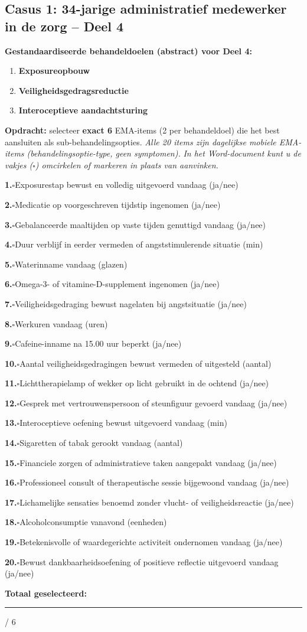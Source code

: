 \documentclass[11pt,a4paper]{article}
\newcommand{\checkitemBFS}[2]{%
\noindent\small\textbf{#1.}\hspace{0.45em}$\square$\hspace{0.4em}#2\par\vspace{0.20em}}
\begin{document}
\newpage
\subsection*{Casus 1: 34-jarige administratief medewerker in de zorg -- Deel 4}

\begin{contextbox}
\small\textbf{Gestandaardiseerde behandeldoelen (abstract) voor Deel 4:}
\begin{enumerate}[topsep=2pt,itemsep=1pt,label=\arabic*.]
\item \textbf{Exposureopbouw}
\item \textbf{Veiligheidsgedragsreductie}
\item \textbf{Interoceptieve aandachtsturing}
\end{enumerate}
\end{contextbox}

\begin{responsebox}[title={Uw antwoord -- Deel 4}]
\small\textbf{Opdracht:} selecteer \textbf{exact 6} EMA-items (2 per behandeldoel) die het best aansluiten als sub-behandelingsopties.
\textit{Alle 20 items zijn dagelijkse mobiele EMA-items (behandelingsoptie-type, geen symptomen).}
\textit{In het Word-document kunt u de vakjes ($\square$) omcirkelen of markeren in plaats van aanvinken.}

\checkitemBFS{1}{Exposurestap bewust en volledig uitgevoerd vandaag (ja/nee)}
\checkitemBFS{2}{Medicatie op voorgeschreven tijdstip ingenomen (ja/nee)}
\checkitemBFS{3}{Gebalanceerde maaltijden op vaste tijden genuttigd vandaag (ja/nee)}
\checkitemBFS{4}{Duur verblijf in eerder vermeden of angststimulerende situatie (min)}
\checkitemBFS{5}{Waterinname vandaag (glazen)}
\checkitemBFS{6}{Omega-3- of vitamine-D-supplement ingenomen (ja/nee)}
\checkitemBFS{7}{Veiligheidsgedraging bewust nagelaten bij angstsituatie (ja/nee)}
\checkitemBFS{8}{Werkuren vandaag (uren)}
\checkitemBFS{9}{Cafeine-inname na 15.00 uur beperkt (ja/nee)}
\checkitemBFS{10}{Aantal veiligheidsgedragingen bewust vermeden of uitgesteld (aantal)}
\checkitemBFS{11}{Lichttherapielamp of wekker op licht gebruikt in de ochtend (ja/nee)}
\checkitemBFS{12}{Gesprek met vertrouwenspersoon of steunfiguur gevoerd vandaag (ja/nee)}
\checkitemBFS{13}{Interoceptieve oefening bewust uitgevoerd vandaag (min)}
\checkitemBFS{14}{Sigaretten of tabak gerookt vandaag (aantal)}
\checkitemBFS{15}{Financiele zorgen of administratieve taken aangepakt vandaag (ja/nee)}
\checkitemBFS{16}{Professioneel consult of therapeutische sessie bijgewoond vandaag (ja/nee)}
\checkitemBFS{17}{Lichamelijke sensaties benoemd zonder vlucht- of veiligheidsreactie (ja/nee)}
\checkitemBFS{18}{Alcoholconsumptie vanavond (eenheden)}
\checkitemBFS{19}{Betekenisvolle of waardegerichte activiteit ondernomen vandaag (ja/nee)}
\checkitemBFS{20}{Bewust dankbaarheidsoefening of positieve reflectie uitgevoerd vandaag (ja/nee)}
\vspace{0.4em}
\noindent\textbf{Totaal geselecteerd:}\hspace{0.5em}\rule{1.2cm}{0.25pt}\hspace{0.2em}/ 6
\end{responsebox}
\end{document}
